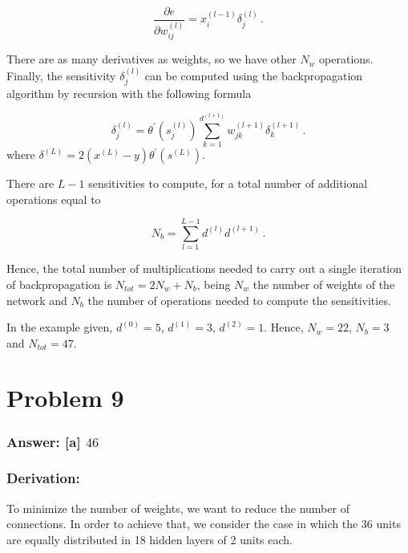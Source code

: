 \documentclass[11pt]{article}
\begin{document}
\begin{equation}
\frac{\partial e}{\partial w_{ij}^{(l)}} = x^{(l-1)}_i \delta^{(l)}_j\,.
\end{equation}

There are as many derivatives as weights, so we have other \(N_w\)
operations. Finally, the sensitivity \(\delta^{(l)}_j\) can be computed
using the backpropagation algorithm by recursion with the following
formula

\begin{equation}
\delta^{(l)}_j=\theta^\prime(s^{(l)}_j)\sum_{k=1}^{d^{(l+1)}} w_{jk}^{(l+1)}\delta^{(l+1)}_k\,.
\end{equation} where
\(\delta^{(L)}=2(x^{(L)}-y)\theta^\prime(s^{(L)})\).

There are \(L-1\) sensitivities to compute, for a total number of
additional operations equal to

\begin{equation}
N_b=\sum_{l=1}^{L-1} d^{(l)}d^{(l+1)}\,.
\end{equation}

Hence, the total number of multiplications needed to carry out a single
iteration of backpropagation is \(N_{tot}=2N_w+N_b\), being \(N_w\) the
number of weights of the network and \(N_b\) the number of operations
needed to compute the sensitivities.

In the example given, \(d^{(0)}=5\), \(d^{(1)}=3\), \(d^{(2)}=1\).
Hence, \(N_w=22\), \(N_b=3\) and \(N_{tot}=47\).

    \hypertarget{problem-9}{%
\section{Problem 9}\label{problem-9}}

\hypertarget{answer-a-46}{%
\subsubsection{\texorpdfstring{Answer: {[}a{]}
\(46\)}{Answer: {[}a{]} 46}}\label{answer-a-46}}

\hypertarget{derivation}{%
\subsubsection{Derivation:}\label{derivation}}

To minimize the number of weights, we want to reduce the number of
connections. In order to achieve that, we consider the case in which the
36 units are equally distributed in 18 hidden layers of 2 units each.
\end{document}
